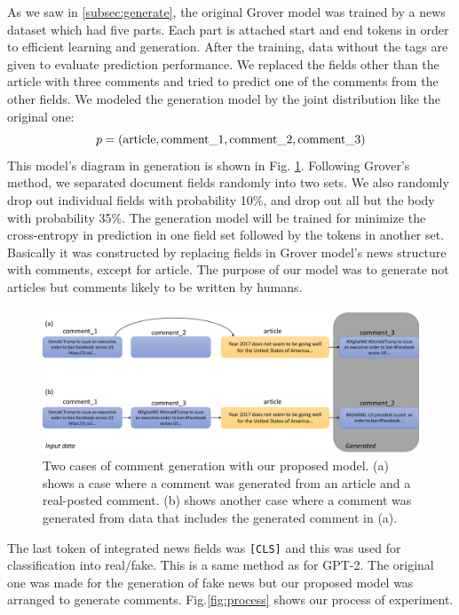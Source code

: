 \documentclass[conference]{IEEEtran}
\begin{document}
As we saw in \ref{subsec:generate}, the original Grover model was trained by a news dataset which had five parts.
Each part is attached start and end tokens in order to efficient learning and generation\cite{NIPS2019_9106}.
After the training, data without the tags are given to evaluate prediction performance.
We replaced the fields other than the article with three comments and tried to predict one of the comments from the other fields.
We modeled the generation model by the joint distribution like the original one:
\begin{equation}
    \label{eq:joint_distri}
    p = (\rm{article}, \rm{comment\_1}, \rm{comment\_2}, \rm{comment\_3})
\end{equation}
This model's diagram in generation is shown in Fig. \ref{fig:method}.
Following Grover's method, we separated document fields randomly into two sets.
We also randomly drop out individual fields with probability 10\%, and drop out all but the body with probability 35\%\cite{NIPS2019_9106}.
The generation model will be trained for minimize the cross-entropy in prediction in one field set followed by the tokens in another set.
Basically it was constructed by replacing fields in Grover model’s news structure with comments, except for article.
The purpose of our model was to generate not articles but comments likely to be written by humans.

\begin{figure}[!t]
    \centering
    \includegraphics[width=\linewidth,pagebox=cropbox,clip]{fig_method.pdf}
    \caption{
        Two cases of comment generation with our proposed model. 
        (a) shows a case where a comment was generated from an article and a real-posted comment. 
        (b) shows another case where a comment was generated from data that includes the generated comment in (a).    }
    \label{fig:method}
\end{figure}

The last token of integrated news fields was \texttt{[CLS]} and this was used for classification into real/fake.
This is a same method as for GPT-2\cite{Radford_GPT2}.
The original one was made for the generation of fake news but our proposed model was arranged to generate comments.
Fig.\ref{fig:process} shows our process of experiment.
\end{document}
